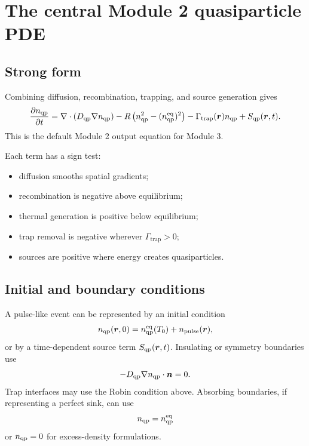 \documentclass[11pt]{article}
\newcommand{\br}{{\bm{r}}}
\newcommand{\trap}{\mathrm{trap}}
\newcommand{\eq}{\mathrm{eq}}
\begin{document}
\section{The central Module 2 quasiparticle PDE}

\subsection{Strong form}
Combining diffusion, recombination, trapping, and source generation gives
\begin{equation}
\frac{\partial n_{\qp}}{\partial t}
=\nabla\cdot\left(D_{\qp}\nabla n_{\qp}\right)
-R\left(n_{\qp}^2-(n_{\qp}^{\eq})^2\right)
-\Gamma_{\trap}(\br)n_{\qp}
+S_{\qp}(\br,t).
\label{eq:central_qp_pde}
\end{equation}
This is the default Module 2 output equation for Module 3.

Each term has a sign test:
\begin{itemize}[leftmargin=1.6em]
    \item diffusion smooths spatial gradients;
    \item recombination is negative above equilibrium;
    \item thermal generation is positive below equilibrium;
    \item trap removal is negative wherever $\Gamma_{\trap}>0$;
    \item sources are positive where energy creates quasiparticles.
\end{itemize}

\subsection{Initial and boundary conditions}
A pulse-like event can be represented by an initial condition
\begin{equation}
 n_{\qp}(\br,0)=n_{\qp}^{\eq}(T_0)+n_{\mathrm{pulse}}(\br),
\end{equation}
or by a time-dependent source term $S_{\qp}(\br,t)$. Insulating or symmetry boundaries use
\begin{equation}
-D_{\mathrm{qp}}\nabla n_{\mathrm{qp}}\cdot\bm{n}=0.
\end{equation}
Trap interfaces may use the Robin condition above. Absorbing boundaries, if representing a perfect sink, can use
\begin{equation}
 n_{\qp}=n_{\qp}^{\eq}
\end{equation}
or $n_{\mathrm{qp}}=0$ for excess-density formulations.
\end{document}
